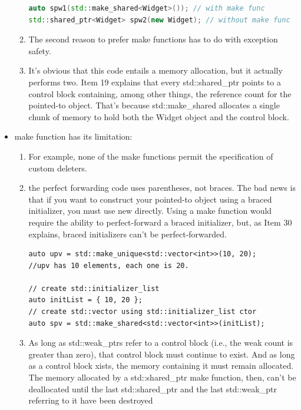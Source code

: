 \documentclass[a4paper,11pt,twoside]{book}
\begin{document}
\begin{itemize}
\begin{enumerate}
\begin{lstlisting}[frame=single, language=c++, mathescape=true]
auto spw1(std::make_shared<Widget>()); // with make func
std::shared_ptr<Widget> spw2(new Widget); // without make func
\end{lstlisting}
		
		\item The second reason to prefer make functions has to do with exception safety.

		\item It's obvious that this code entails a memory allocation, but it actually performs two. Item 19 explains that every std::shared\_ptr points to a control block containing, among other things, the reference count for the pointed-to object. That's because std::make\_shared allocates a single chunk of memory to hold both the Widget object and the control block.
		
	\end{enumerate}
	
	\item make function has its limitation:
	\begin{enumerate}
		\item For example, none of the make functions permit the specification of custom deleters.
		
		\item the perfect forwarding code uses parentheses, not braces. The bad news is that if you want to construct your pointed-to object using a braced initializer, you must use new directly. Using a make function would require the ability to perfect-forward a braced initializer, but, as Item 30 explains, braced initializers can't be perfect-forwarded.
\begin{lstlisting}
auto upv = std::make_unique<std::vector<int>>(10, 20);
//upv has 10 elements, each one is 20.

// create std::initializer_list
auto initList = { 10, 20 };
// create std::vector using std::initializer_list ctor
auto spv = std::make_shared<std::vector<int>>(initList);
\end{lstlisting}
		
		\item As long as std::weak\_ptrs refer to a control block (i.e., the weak count is greater than zero), that control block must continue to exist. And as long as a control block xists, the memory containing it must remain allocated. The memory allocated by a std::shared\_ptr make function, then, can't be deallocated until the last std::shared\_ptr and the last std::weak\_ptr referring to it have been destroyed
	\end{enumerate}
	

\end{itemize}
\end{document}
